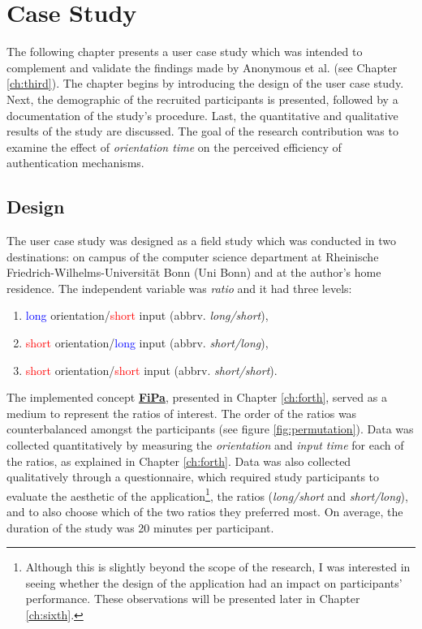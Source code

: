 
\chapter{Case Study}\label{ch:fifth}

The following chapter presents a user case study which was intended to complement and validate the findings made by Anonymous et al. \cite{anonymous} (see Chapter \ref{ch:third}). The chapter begins by introducing the design of the user case study. Next, the demographic of the recruited participants is presented, followed by a documentation of the study's procedure. Last, the quantitative and qualitative results of the study are discussed. The goal of the research contribution was to examine the effect of \textit{orientation time} on the perceived efficiency of authentication mechanisms. 

\section{Design} \label{5.1}

The user case study was designed as a field study which was conducted in two destinations: on campus of the computer science department at Rheinische Friedrich-Wilhelms-Universit{\"a}t Bonn (Uni Bonn) and at the author's home residence. The independent variable was \textit{ratio} and it had three levels:
\begin{enumerate}
    \item \textcolor{blue}{long} orientation/\textcolor{red}{short} input (abbrv. \textit{long/short}), 
    \item \textcolor{red}{short} orientation/\textcolor{blue}{long} input (abbrv. \textit{short/long}), 
    \item \textcolor{red}{short} orientation/\textcolor{red}{short} input (abbrv. \textit{short/short}). 
\end{enumerate}

The implemented concept \underline{\textbf{FiPa}}, presented in Chapter \ref{ch:forth}, served as a medium to represent the ratios of interest. The order of the ratios was counterbalanced amongst the participants (see figure \ref{fig:permutation}). Data was collected quantitatively by measuring the \textit{orientation} and \textit{input time} for each of the ratios, as explained in Chapter \ref{ch:forth}. Data was also collected qualitatively through a questionnaire, which required study participants to evaluate the aesthetic of the application\footnote{Although this is slightly beyond the scope of the research, I was interested in seeing whether the design of the application had an impact on participants' performance. These observations will be presented later in Chapter \ref{ch:sixth}.}, the ratios (\textit{long/short} and \textit{short/long}), and to also choose which of the two ratios they preferred most. On average, the duration of the study was 20 minutes per participant. 

